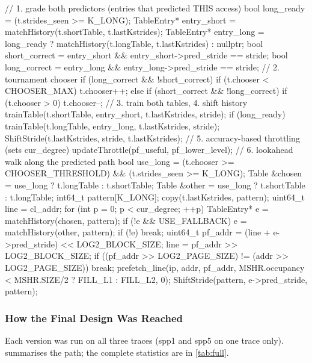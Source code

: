 \documentclass[11pt,a4paper]{article}
\theoremstyle{themethm}
\theoremstyle{themedef}
\theoremstyle{themeex}
\theoremstyle{themerem}
\begin{document}
\begin{cppcode}
// 1. grade both predictors (entries that predicted THIS access)
bool long_ready = (t.strides_seen >= K_LONG);
TableEntry* entry_short = matchHistory(t.shortTable, t.lastKstrides);
TableEntry* entry_long  = long_ready ? matchHistory(t.longTable, t.lastKstrides) : nullptr;
bool short_correct = entry_short && entry_short->pred_stride == stride;
bool long_correct  = entry_long  && entry_long->pred_stride  == stride;
// 2. tournament chooser
if (long_correct && !short_correct)      { if (t.chooser < CHOOSER_MAX) t.chooser++; }
else if (short_correct && !long_correct) { if (t.chooser > 0) t.chooser--; }
// 3. train both tables, 4. shift history
trainTable(t.shortTable, entry_short, t.lastKstrides, stride);
if (long_ready) trainTable(t.longTable, entry_long, t.lastKstrides, stride);
ShiftStride(t.lastKstrides, stride, t.lastKstrides);
// 5. accuracy-based throttling (sets cur_degree)
updateThrottle(pf_useful, pf_lower_level);
// 6. lookahead walk along the predicted path
bool use_long = (t.chooser >= CHOOSER_THRESHOLD) && (t.strides_seen >= K_LONG);
Table &chosen = use_long ? t.longTable : t.shortTable;
Table &other  = use_long ? t.shortTable : t.longTable;
int64_t pattern[K_LONG];  copy(t.lastKstrides, pattern);
uint64_t line = cl_addr;
for (int p = 0; p < cur_degree; ++p) {
    TableEntry* e = matchHistory(chosen, pattern);
    if (!e && USE_FALLBACK) e = matchHistory(other, pattern);
    if (!e) break;
    uint64_t pf_addr = (line + e->pred_stride) << LOG2_BLOCK_SIZE;
    line = pf_addr >> LOG2_BLOCK_SIZE;
    if ((pf_addr >> LOG2_PAGE_SIZE) != (addr >> LOG2_PAGE_SIZE)) break;
    prefetch_line(ip, addr, pf_addr, MSHR.occupancy < MSHR.SIZE/2 ? FILL_L1 : FILL_L2, 0);
    ShiftStride(pattern, e->pred_stride, pattern);
}
\end{cppcode}

\subsubsection{How the Final Design Was Reached}\label{sec:spp-evolution}
Each version was run on all three traces (spp1 and spp5 on one trace only).
 summarises the path; the complete statistics are in
\cref{tab:full}.
\end{document}
